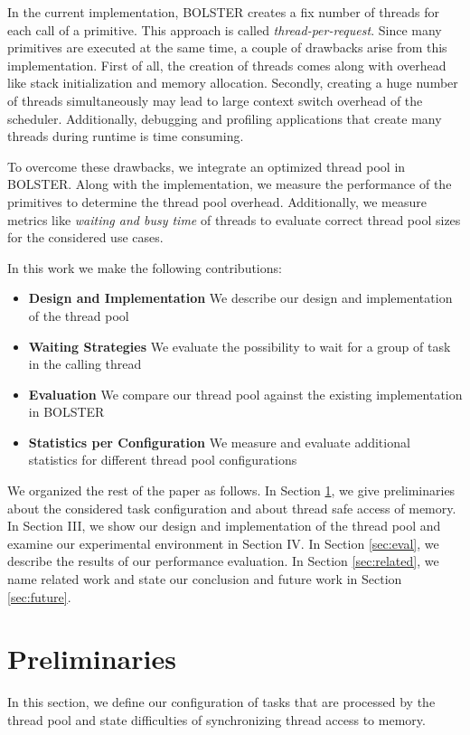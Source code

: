 \documentclass[conference]{IEEEtran}
\begin{document}
In the current implementation, BOLSTER creates a fix number of threads for each call of a primitive. This approach is called \emph{thread-per-request}. Since many primitives are executed at the same time, a couple of drawbacks arise from this implementation.
First of all, the creation of threads comes along with overhead like stack initialization and memory allocation. Secondly, creating a huge number of threads simultaneously may lead to large context switch overhead of the scheduler. Additionally, debugging and profiling applications that create many threads during runtime is time consuming.

To overcome these drawbacks, we integrate an optimized thread pool in BOLSTER. Along with the implementation, we measure the performance of the primitives to determine the thread pool overhead. Additionally, we measure metrics like \emph{waiting and busy time} of threads to evaluate correct thread pool sizes for the considered use cases. 

In this work we make the following contributions:
\begin{itemize}
	\item \textbf{Design and Implementation} We describe our design and implementation of the thread pool
	\item \textbf{Waiting Strategies} We evaluate the possibility to wait for a group of task in the calling thread
	\item \textbf{Evaluation} We compare our thread pool against the existing implementation in BOLSTER
	\item \textbf{Statistics per Configuration} We measure and evaluate additional statistics for different thread pool configurations
\end{itemize}
We organized the rest of the paper as follows. In Section \ref{sec:pre}, we give preliminaries about the considered task configuration and about thread safe access of memory. In Section III, we show our design and implementation of the thread pool and examine our experimental environment in Section IV. In Section \ref{sec:eval}, we describe the results of our performance evaluation. In Section \ref{sec:related}, we name related work and state our conclusion and future work in Section \ref{sec:future}.

\section{Preliminaries}\label{sec:pre}
In this section, we define our configuration of tasks that are processed by the thread pool and state difficulties of synchronizing thread access to memory.
\end{document}
